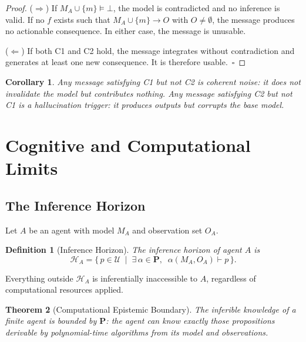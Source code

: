 \documentclass{article}
\newcommand{\Univ}{\mathcal{U}}
\newcommand{\Horizon}{\mathcal{H}}
\newcommand{\MA}{M_A}
\newtheorem{theorem}{Theorem}
\newtheorem{corollary}[theorem]{Corollary}
\newtheorem{definition}{Definition}
\begin{document}
\begin{proof}
($\Rightarrow$) If $\MA \cup \{m\} \models \bot$, the model is contradicted and
no inference is valid.  If no $f$ exists such that $\MA \cup \{m\} \to O$ with
$O \neq \emptyset$, the message produces no actionable consequence.  In either
case, the message is unusable.

($\Leftarrow$) If both C1 and C2 hold, the message integrates without
contradiction and generates at least one new consequence.  It is therefore
usable.~$\square$
\end{proof}

\begin{corollary}
Any message satisfying C1 but not C2 is \emph{coherent noise}: it does not
invalidate the model but contributes nothing.  Any message satisfying C2 but not
C1 is a \emph{hallucination trigger}: it produces outputs but corrupts the base
model.
\end{corollary}

\section{Cognitive and Computational Limits}
\label{sec:limits}

\subsection{The Inference Horizon}

Let $A$ be an agent with model $\MA$ and observation set $O_A$.

\begin{definition}[Inference Horizon]
The \emph{inference horizon} of agent $A$ is
\[
  \Horizon_A = \bigl\{\, p \in \Univ \;\mid\;
    \exists\, \alpha \in \mathbf{P},\;\; \alpha(\MA, O_A) \vdash p \,\bigr\}.
\]
\end{definition}

Everything outside $\Horizon_A$ is inferentially inaccessible to $A$, regardless
of computational resources applied.

\begin{theorem}[Computational Epistemic Boundary]
\label{thm:horizon}
The inferible knowledge of a finite agent is bounded by $\mathbf{P}$: the agent
can know exactly those propositions derivable by polynomial-time algorithms from
its model and observations.
\end{theorem}
\end{document}
